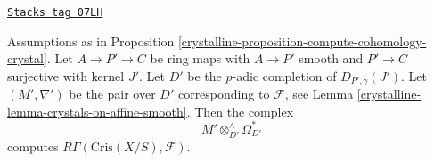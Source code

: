 \begin{lemma}
\label{crystalline-lemma-compute-cohomology-crystal-smooth}
\href{https://stacks.math.columbia.edu/tag/07LH}{\texttt{Stacks tag 07LH}}

Assumptions as in Proposition \ref{crystalline-proposition-compute-cohomology-crystal}.
Let $A \to P' \to C$ be ring maps with $A \to P'$ smooth and $P' \to C$
surjective with kernel $J'$. Let $D'$ be the $p$-adic completion of
$D_{P', \gamma}(J')$. Let $(M', \nabla')$ be the pair over $D'$
corresponding to $\mathcal{F}$, see
Lemma \ref{crystalline-lemma-crystals-on-affine-smooth}. Then the complex
$$
M' \otimes^\wedge_{D'} \Omega^*_{D'}
$$
computes $R\Gamma(\text{Cris}(X/S), \mathcal{F})$.
\end{lemma}

